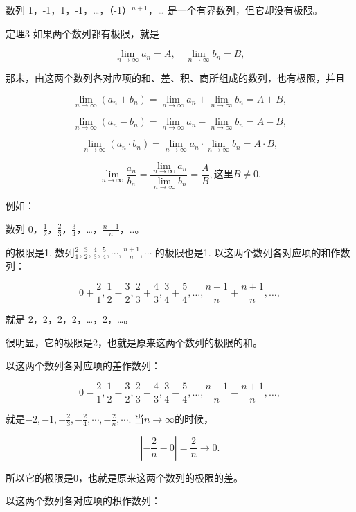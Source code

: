数列 1，-1，1，-1，\ldots，（-1）\(^{n+1}\)，\ldots{}
是一个有界数列，但它却没有极限。

定理3 如果两个数列都有极限，就是

\[
\lim_{n \rightarrow \infty} a_{n} = A, \quad \lim_{n \rightarrow \infty} b_{n} = B,
\]

那末，由这两个数列各对应项的和、差、积、商所组成的数列，也有极限，并且

\[
\lim_{n \rightarrow \infty} (a_{n} + b_{n}) = \lim_{n \rightarrow \infty} a_{n} + \lim_{n \rightarrow \infty} b_{n} = A + B,
\]

\[
\lim_{n \rightarrow \infty} (a_{n} - b_{n}) = \lim_{n \rightarrow \infty} a_{n} - \lim_{n \rightarrow \infty} b_{n} = A - B,
\]

\[
\lim_{n \rightarrow \infty} (a_{n} \cdot b_{n}) = \lim_{n \rightarrow \infty} a_{n} \cdot \lim_{n \rightarrow \infty} b_{n} = A \cdot B,
\]

\[
\lim_{n \rightarrow \infty} \frac{a_{n}}{b_{n}} = \frac{\lim_{n \rightarrow \infty} a_{n}}{\lim_{n \rightarrow \infty} b_{n}} = \frac{A}{B}, \text{这里} B \neq 0.
\]

例如：

数列
0，\(\frac{1}{2}\)，\(\frac{2}{3}\)，\(\frac{3}{4}\)，\ldots，\(\frac{n-1}{n}\)，..。

的极限是1.
数列\(\frac{2}{1}, \frac{3}{2}, \frac{4}{3}, \frac{5}{4}, \cdots, \frac{n+1}{n}, \cdots\)
的极限也是1. 以这两个数列各对应项的和作数列：

\[
0 + \frac{2}{1}, \frac{1}{2} - \frac{3}{2}, \frac{2}{3} + \frac{4}{3}, \frac{3}{4} + \frac{5}{4}, \dots, \frac{n - 1}{n} + \frac{n + 1}{n}, \dots,
\]

就是 2，2，2，2，\ldots，2，\ldots。

很明显，它的极限是2，也就是原来这两个数列的极限的和。

以这两个数列各对应项的差作数列：

\[
0 - \frac{2}{1}, \frac{1}{2} - \frac{3}{2}, \frac{2}{3} - \frac{4}{3}, \frac{3}{4} - \frac{5}{4}, \dots, \frac{n - 1}{n} - \frac{n + 1}{n}, \dots,
\]

就是\(-2, -1, -\frac{2}{3}, -\frac{2}{4}, \cdots, -\frac{2}{n}, \cdots.\)
当\(n \to \infty\)的时候，

\[
\left| - \frac{2}{n} - 0 \right| = \frac{2}{n} \rightarrow 0.
\]

所以它的极限是0，也就是原来这两个数列的极限的差。

以这两个数列各对应项的积作数列：

